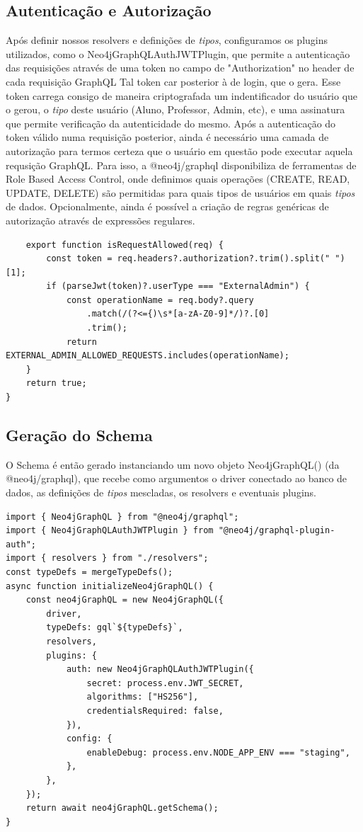 \subsection{Autenticação e Autorização}

Após definir nossos resolvers e definições de \textit{tipos}, configuramos os plugins utilizados, como o Neo4jGraphQLAuthJWTPlugin, que permite a autenticação das requisições através de uma token no campo de "Authorization" no header de cada requisição GraphQL Tal token car posterior à de login, que o gera. Esse token carrega consigo de maneira criptografada um indentificador do usuário que o gerou, o \textit{tipo} deste usuário (Aluno, Professor, Admin, etc), e uma assinatura que permite verificação da autenticidade do mesmo.
Após a autenticação do token válido numa requisição posterior, ainda é necessário uma camada de autorização para termos certeza que o usuário em questão pode executar aquela requsição GraphQL. Para isso, a @neo4j/graphql disponibiliza de ferramentas de Role Based Access Control, onde definimos quais operações (CREATE, READ, UPDATE, DELETE) são permitidas para quais tipos de usuários em quais \textit{tipos} de dados. Opcionalmente, ainda é possível a criação de regras genéricas de autorização através de expressões regulares.

\begin{lstlisting}
    export function isRequestAllowed(req) {
    	const token = req.headers?.authorization?.trim().split(" ")[1];
    	if (parseJwt(token)?.userType === "ExternalAdmin") {
    		const operationName = req.body?.query
    			.match(/(?<={)\s*[a-zA-Z0-9]*/)?.[0]
    			.trim();
    		return EXTERNAL_ADMIN_ALLOWED_REQUESTS.includes(operationName);
	}
	return true;
}
\end{lstlisting}

\subsection{Geração do Schema}

 O Schema é então gerado instanciando um novo objeto Neo4jGraphQL() (da @neo4j/graphql), que recebe como argumentos o driver conectado ao banco de dados, as definições de \textit{tipos} mescladas, os resolvers e eventuais plugins.

\begin{lstlisting}
import { Neo4jGraphQL } from "@neo4j/graphql";
import { Neo4jGraphQLAuthJWTPlugin } from "@neo4j/graphql-plugin-auth";
import { resolvers } from "./resolvers";
const typeDefs = mergeTypeDefs();
async function initializeNeo4jGraphQL() {
	const neo4jGraphQL = new Neo4jGraphQL({
		driver,
		typeDefs: gql`${typeDefs}`,
		resolvers,
		plugins: {
			auth: new Neo4jGraphQLAuthJWTPlugin({
				secret: process.env.JWT_SECRET,
				algorithms: ["HS256"],
				credentialsRequired: false,
			}),
			config: {
				enableDebug: process.env.NODE_APP_ENV === "staging",
			},
		},
	});
	return await neo4jGraphQL.getSchema();
}
\end{lstlisting}

